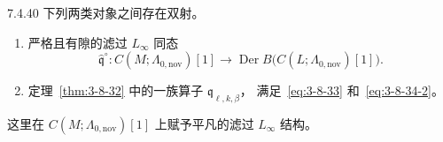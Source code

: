 \begin{corollary}{7.4.40}\label{cor:7-4-40}
下列两类对象之间存在双射。
\begin{enumerate}[label=\textup{(\arabic*)},leftmargin=2.8em]
\item 严格且有隙的滤过
$L_\infty$ 同态
\[
\widehat{\mathfrak q}^{\circ}:
C(M;\Lambda_{0,\mathrm{nov}})[1]
\longrightarrow
\operatorname{Der}B
\bigl(C(L;\Lambda_{0,\mathrm{nov}})[1]\bigr).
\]

\item 定理~\ref{thm:3-8-32}
中的一族算子
$\mathfrak q_{\ell,k,\beta}$，
满足~\eqref{eq:3-8-33}
和~\eqref{eq:3-8-34-2}。
\end{enumerate}
\end{corollary}

这里在
$C(M;\Lambda_{0,\mathrm{nov}})[1]$
上赋予平凡的滤过
$L_\infty$ 结构。
